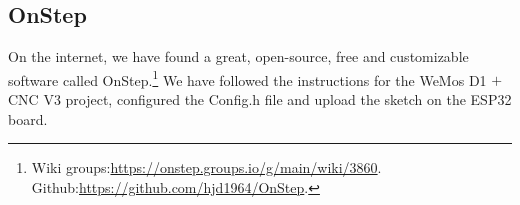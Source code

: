 \documentclass{article}
\begin{document}
\begin{multicols}{2}
        \subsection{OnStep}
        On the internet, we have found a great, open-source, free and customizable software called OnStep.\footnote{Wiki groups:\url{https://onstep.groups.io/g/main/wiki/3860}.\\Github:\url{https://github.com/hjd1964/OnStep}.}
        We have followed the instructions for the WeMos D1 \(+\) CNC V3 project, configured the Config.h file and upload the sketch on the ESP32 board.

\end{multicols}
\end{document}
